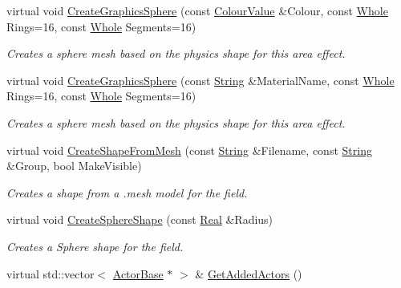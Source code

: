\begin{DoxyCompactItemize}
virtual void \hyperlink{classphys_1_1AreaEffect_a6d1e8ddcea39fa441f02010af1970a16}{CreateGraphicsSphere} (const \hyperlink{classphys_1_1ColourValue}{ColourValue} \&Colour, const \hyperlink{namespacephys_a460f6bc24c8dd347b05e0366ae34f34a}{Whole} Rings=16, const \hyperlink{namespacephys_a460f6bc24c8dd347b05e0366ae34f34a}{Whole} Segments=16)
\begin{DoxyCompactList}\small\item\em Creates a sphere mesh based on the physics shape for this area effect. \item\end{DoxyCompactList}\item 
virtual void \hyperlink{classphys_1_1AreaEffect_acf78863312a29935efbfdf60c073ae3c}{CreateGraphicsSphere} (const \hyperlink{namespacephys_aa03900411993de7fbfec4789bc1d392e}{String} \&MaterialName, const \hyperlink{namespacephys_a460f6bc24c8dd347b05e0366ae34f34a}{Whole} Rings=16, const \hyperlink{namespacephys_a460f6bc24c8dd347b05e0366ae34f34a}{Whole} Segments=16)
\begin{DoxyCompactList}\small\item\em Creates a sphere mesh based on the physics shape for this area effect. \item\end{DoxyCompactList}\item 
virtual void \hyperlink{classphys_1_1AreaEffect_a8b7c0c8c9becb9aad10ac31ad923c0e2}{CreateShapeFromMesh} (const \hyperlink{namespacephys_aa03900411993de7fbfec4789bc1d392e}{String} \&Filename, const \hyperlink{namespacephys_aa03900411993de7fbfec4789bc1d392e}{String} \&Group, bool MakeVisible)
\begin{DoxyCompactList}\small\item\em Creates a shape from a .mesh model for the field. \item\end{DoxyCompactList}\item 
virtual void \hyperlink{classphys_1_1AreaEffect_a5a4337e4b7a01b9b4d16a5e8bbdec1c8}{CreateSphereShape} (const \hyperlink{namespacephys_af7eb897198d265b8e868f45240230d5f}{Real} \&Radius)
\begin{DoxyCompactList}\small\item\em Creates a Sphere shape for the field. \item\end{DoxyCompactList}\item 
virtual std::vector$<$ \hyperlink{classphys_1_1ActorBase}{ActorBase} $\ast$ $>$ \& \hyperlink{classphys_1_1AreaEffect_a72a9673c926ce876df630c4aecfc09f6}{GetAddedActors} ()

\end{DoxyCompactItemize}
